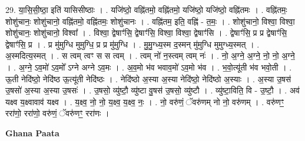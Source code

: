 \documentclass[17pt]{extarticle}
\begin{document}
29. या॒सि॒सी॒ष्ठा॒ इति॑ यासिसीष्ठाः । . यजि॑ष्ठो॒ वह्नि॑तमो॒ वह्नि॑तमो॒ यजि॑ष्ठो॒ यजि॑ष्ठो॒ वह्नि॑तमः । . वह्नि॑तमः॒ शोशु॑चानः॒ शोशु॑चानो॒ वह्नि॑तमो॒ वह्नि॑तमः॒ शोशु॑चानः । . वह्नि॑तम॒ इति॒ वह्नि॑ - त॒मः॒ । . शोशु॑चानो॒ विश्वा॒ विश्वा॒ शोशु॑चानः॒ शोशु॑चानो॒ विश्वा᳚ । . विश्वा॒ द्वेषाꣳ॑सि॒ द्वेषाꣳ॑सि॒ विश्वा॒ विश्वा॒ द्वेषाꣳ॑सि । . द्वेषाꣳ॑सि॒ प्र प्र द्वेषाꣳ॑सि॒ द्वेषाꣳ॑सि॒ प्र । . प्र मु॑मुग्धि मुमुग्धि॒ प्र प्र मु॑मुग्धि । . मु॒मु॒ग्ध्य॒स्म द॒स्मन् मु॑मुग्धि मुमुग्ध्य॒स्मत् । . अ॒स्मदित्य॒स्मत् । . स त्वम् त्वꣳ स स त्वम् । . त्वम् नो॑ न॒स्त्वम् त्वम् नः॑ । . नो॒ अ॒ग्ने॒ अ॒ग्ने॒ नो॒ नो॒ अ॒ग्ने॒ । . अ॒ग्ने॒ ऽव॒मो॑ ऽव॒मो᳚ ऽग्ने अग्ने ऽव॒मः । . अ॒व॒मो भ॑व भवाव॒मो॑ ऽव॒मो भ॑व । . भ॒वो॒त्यू॑ती भ॑व भवो॒ती । . ऊ॒ती नेदि॑ष्ठो॒ नेदि॑ष्ठ ऊ॒त्यू॑ती नेदि॑ष्ठः । . नेदि॑ष्ठो अ॒स्या अ॒स्या नेदि॑ष्ठो॒ नेदि॑ष्ठो अ॒स्याः । . अ॒स्या उ॒षस॑ उ॒षसो॑ अ॒स्या अ॒स्या उ॒षसः॑ । . उ॒षसो॒ व्यु॑ष्टौ॒ व्यु॑ष्टा वु॒षस॑ उ॒षसो॒ व्यु॑ष्टौ । . व्यु॑ष्टा॒विति॒ वि - उ॒ष्टौ॒ । . अव॑ यक्ष्व य॒क्ष्वावाव॑ यक्ष्व । . य॒क्ष्व॒ नो॒ नो॒ य॒क्ष्व॒ य॒क्ष्व॒ नः॒ । . नो॒ वरु॑णं॒ ॅवरु॑णम् नो नो॒ वरु॑णम् । . वरु॑णꣳ॒॒ ररा॑णो॒ ररा॑णो॒ वरु॑णं॒ ॅवरु॑णꣳ॒॒ ररा॑णः । \newline

\textbf{Ghana Paata } \newline
\end{document}

